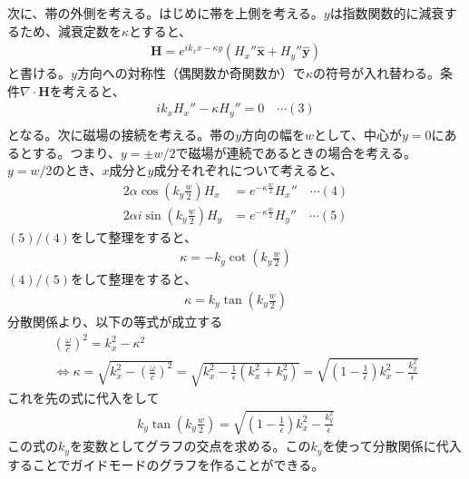 \documentclass[a4paper,11pt,dvipdfmx]{jsarticle}
\begin{document}
\begin{enumerate}
        次に、帯の外側を考える。はじめに帯を上側を考える。$y$は指数関数的に減衰するため、減衰定数を$\kappa$とすると、
        \begin{align*}
          \mathbf{H} = e^{i k_x x - \kappa y}\left( H_x'' \hat{\boldsymbol{x}} + H_y'' \hat{\boldsymbol{y}} \right)
        \end{align*}
        と書ける。$y$方向への対称性（偶関数か奇関数か）で$\kappa$の符号が入れ替わる。条件$\nabla \cdot \mathbf{H}$を考えると、
        \begin{align*}
          i k_x H_x'' - \kappa H_y'' = 0 \quad \cdots (3) \\
        \end{align*}
        となる。次に磁場の接続を考える。帯の$y$方向の幅を$w$として、中心が$y = 0$にあるとする。つまり、$y = \pm w / 2$で磁場が連続であるときの場合を考える。
        $y = w / 2$のとき、$x成分とy$成分それぞれについて考えると、
        \begin{align*}
          2 \alpha \cos \left( k_y \frac{w}{2} \right)H_x &= e^{- \kappa \frac{w}{2}} H_x'' \quad \cdots (4) \\
          2 \alpha i \sin \left( k_y \frac{w}{2} \right)H_y &= e^{- \kappa \frac{w}{2}} H_y'' \quad \cdots (5)
        \end{align*}
        $(5)/(4)$をして整理をすると、
        \begin{align*}
          \kappa = - k_y \cot \left( k_y \frac{w}{2} \right)
        \end{align*}
        $(4)/(5)$をして整理をすると、
        \begin{align*}
          \kappa = k_y \tan \left( k_y \frac{w}{2} \right)
        \end{align*}
        分散関係より、以下の等式が成立する
        \begin{gather*}
          \left( \frac{\omega}{c} \right)^2 = k_x^2 - \kappa^2
          \\
          \Longleftrightarrow  
          \kappa = \sqrt{k_x^2 - \left( \frac{\omega}{c} \right)^2} = \sqrt{k_x^2 - \frac{1}{\epsilon}(k_x^2 + k_y^2)} = \sqrt{\left( 1 - \frac{1}{\epsilon} \right) k_x^2 - \frac{k_y^2}{\epsilon}}
        \end{gather*}
        これを先の式に代入をして
        \begin{align*}
          k_y \tan \left( k_y \frac{w}{2} \right) = \sqrt{\left( 1 - \frac{1}{\epsilon} \right) k_x^2 - \frac{k_y^2}{\epsilon}}
        \end{align*}
        この式の$k_y$を変数としてグラフの交点を求める。この$k_y$を使って分散関係に代入することでガイドモードのグラフを作ることができる。
    \end{enumerate}
    
\end{document}
